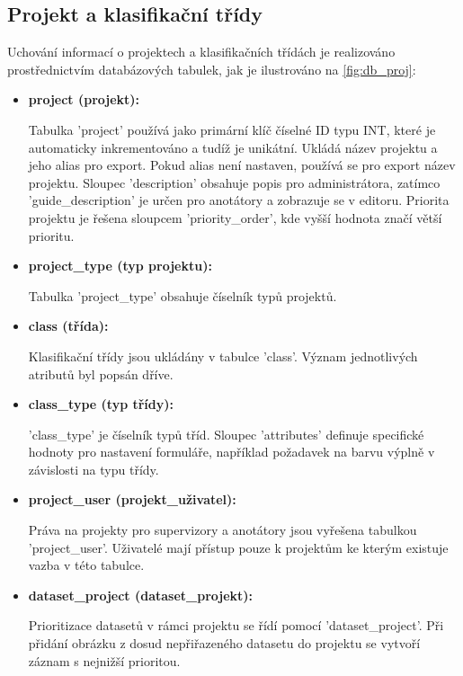 \subsection{Projekt a klasifikační třídy}

Uchování informací o projektech a klasifikačních třídách je realizováno prostřednictvím databázových tabulek, jak je ilustrováno na \vref{fig:db_proj}:


\begin{itemize}
  \item \textbf{project (projekt):}

  Tabulka 'project' používá jako primární klíč číselné ID typu INT, které je automaticky inkrementováno a tudíž je unikátní. Ukládá název projektu a jeho alias pro export. Pokud alias není nastaven, používá se pro export název projektu. Sloupec 'description' obsahuje popis pro administrátora, zatímco 'guide\_description' je určen pro anotátory a zobrazuje se v editoru. Priorita projektu je řešena sloupcem 'priority\_order', kde vyšší hodnota značí větší prioritu.

  \item \textbf{project\_type (typ projektu):}
  
  Tabulka 'project\_type' obsahuje číselník typů projektů.

  \item \textbf{class (třída):}
  
  Klasifikační třídy jsou ukládány v tabulce 'class'. Význam jednotlivých atributů byl popsán dříve.

  \item \textbf{class\_type (typ třídy):}
  
  'class\_type' je číselník typů tříd. Sloupec 'attributes' definuje specifické hodnoty pro nastavení formuláře, například požadavek na barvu výplně v závislosti na typu třídy.

  \item \textbf{project\_user (projekt\_uživatel):}
  
  Práva na projekty pro supervizory a anotátory jsou vyřešena tabulkou  'project\_user'. Uživatelé mají přístup pouze k projektům ke kterým existuje vazba v této tabulce.

  \item \textbf{dataset\_project (dataset\_projekt):}
  
  Prioritizace datasetů v rámci projektu se řídí pomocí 'dataset\_project'. Při přidání obrázku z dosud nepřiřazeného datasetu do projektu se vytvoří záznam s nejnižší prioritou.
\end{itemize}

